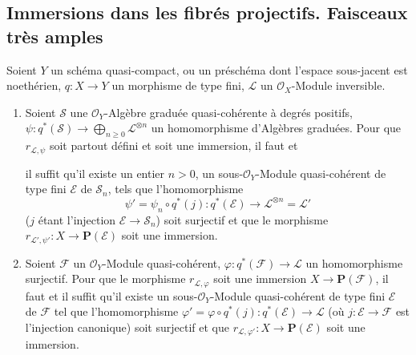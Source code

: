 \subsection{Immersions dans les fibrés projectifs. Faisceaux très amples}
\label{subsection:II.4.4-fr}

\begin{proposition}[4.4.1]
\label{II.4.4.1-fr}
Soient $Y$ un schéma quasi-compact, ou un préschéma dont l'espace sous-jacent
est noethérien, $q:X\to Y$ un morphisme de type fini, $\mathcal{L}$ un
$\mathcal{O}_X$-Module inversible.
\begin{enumerate}
  \item[\rm{(i)}] Soient $\mathcal{S}$ une $\mathcal{O}_Y$-Algèbre graduée
  quasi-cohérente à degrés positifs,
  $\psi:q^*(\mathcal{S})\to\bigoplus_{n\geq0}\mathcal{L}^{\otimes n}$ un
  homomorphisme d'Algèbres graduées. Pour que $r_{\mathcal{L},\psi}$ soit
  partout défini et soit une immersion, il faut et


  il suffit qu'il existe un entier $n>0$, un sous-$\mathcal{O}_Y$-Module
  quasi-cohérent de type fini $\mathcal{E}$ de $\mathcal{S}_n$, tels que
  l'homomorphisme
  \[
    \psi'=\psi_n\circ q^*(j):q^*(\mathcal{E})
      \longrightarrow\mathcal{L}^{\otimes n}=\mathcal{L}'
  \]
  ($j$ étant l'injection $\mathcal{E}\to\mathcal{S}_n$) soit surjectif et que
  le morphisme
  $r_{\mathcal{L}',\psi'}:X\to\mathbf{P}(\mathcal{E})$ soit une immersion.
  \item[\rm{(ii)}] Soient $\mathcal{F}$ un $\mathcal{O}_Y$-Module
  quasi-cohérent, $\varphi:q^*(\mathcal{F})\to\mathcal{L}$ un homomorphisme
  surjectif. Pour que le morphisme $r_{\mathcal{L},\varphi}$ soit une
  immersion $X\to\mathbf{P}(\mathcal{F})$, il faut et il suffit qu'il existe
  un sous-$\mathcal{O}_Y$-Module quasi-cohérent de type fini $\mathcal{E}$ de
  $\mathcal{F}$ tel que l'homomorphisme
  $\varphi'=\varphi\circ q^*(j):q^*(\mathcal{E})\to\mathcal{L}$ (où
  $j:\mathcal{E}\to\mathcal{F}$ est l'injection canonique) soit surjectif et
  que $r_{\mathcal{L},\varphi'}:X\to\mathbf{P}(\mathcal{E})$ soit une
  immersion.
\end{enumerate}
\end{proposition}

